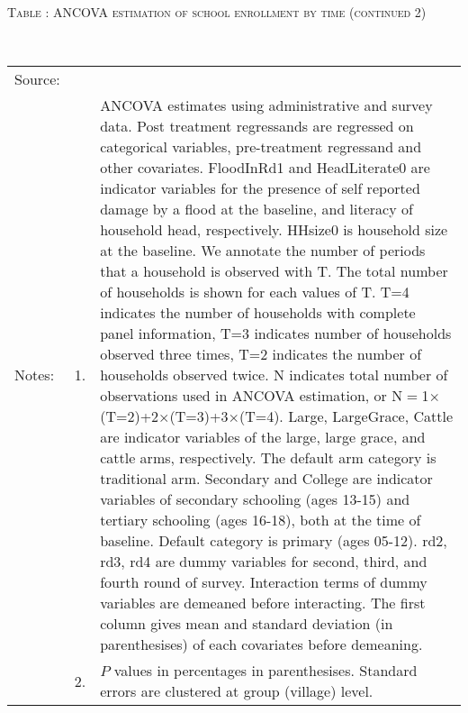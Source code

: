 \hspace{-1cm}\begin{minipage}[t]{14cm}
\hfil\textsc{\normalsize Table \thetable: ANCOVA estimation of school enrollment by time (continued 2)\label{tab ANCOVA enroll time varying3}}\\
\setlength{\tabcolsep}{1pt}
\setlength{\baselineskip}{8pt}
\renewcommand{\arraystretch}{.525}
\hfil{}\\
\renewcommand{\arraystretch}{.8}
\setlength{\tabcolsep}{1pt}
\hspace{-1cm}\begin{tabular}{>{\hfill\scriptsize}p{1cm}<{}>{\hfill\scriptsize}p{.25cm}<{}>{\scriptsize}p{14cm}<{\hfill}}
Source:& \multicolumn{2}{l}{\scriptsize Estimated with GUK administrative and survey data.}\\
Notes: & 1. & ANCOVA estimates using administrative and survey data. Post treatment regressands are regressed on categorical variables, pre-treatment regressand and other covariates. \textsf{FloodInRd1} and \textsf{HeadLiterate0} are indicator variables for the presence of self reported damage by a flood at the baseline, and literacy of household head, respectively. \textsf{HHsize0} is household size at the baseline. We annotate the number of periods that a household is observed with \textsf{T}. The total number of households is shown for each values of \textsf{T}. \textsf{T=4} indicates the number of households with complete panel information, \textsf{T=3} indicates number of households observed three times, \textsf{T=2} indicates the number of households observed twice. \textsf{N} indicates total number of observations used in ANCOVA estimation, or \textsf{N$=$1$\times$(T=2)+2$\times$(T=3)+3$\times$(T=4)}.  \textsf{Large}, \textsf{LargeGrace}, \textsf{Cattle} are indicator variables of the \textsf{large}, \textsf{large grace}, and \textsf{cattle} arms, respectively. The default arm category is \textsf{traditional} arm. \textsf{Secondary} and \textsf{College} are indicator variables of secondary schooling (ages 13-15) and tertiary schooling (ages 16-18), both at the time of baseline. Default category is primary (ages 05-12). \textsf{rd2, rd3, rd4} are dummy variables for second, third, and fourth round of survey. Interaction terms of dummy variables are demeaned before interacting. The first column gives mean and standard deviation (in parenthesises) of each covariates before demeaning.\\
& 2. & $P$ values in percentages in parenthesises. Standard errors are clustered at group (village) level.%
\end{tabular}
\end{minipage}


